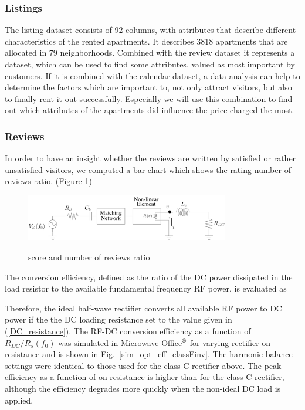 \subsubsection{Listings}
The listing dataset consists of 92 columns, with attributes that describe different characteristics of the rented apartments. It describes 3818 apartments that are allocated in 79 neighborhoods. Combined with the review dataset it represents a dataset, which can be used to find some attributes, valued as most important by customers. If it is combined with the calendar dataset, a data analysis can help to determine the factors which are important to, not only attract visitors, but also to finally rent it out successfully. Especially we will use this combination to find out which attributes of the apartments did influence the price charged the most.
\subsubsection{Reviews}
In order to have an insight whether the reviews are written by satisfied or rather unsatisfied visitors, we computed a bar chart which shows the rating-number of reviews ratio. (Figure \ref{score_reviews_ratio})
\begin{figure}
  \begin{center}
  \includegraphics[width=3.5in]{pdf/01.pdf}\\
  \caption{score and number of reviews ratio}\label{score_reviews_ratio}
  \end{center}
\end{figure}


The conversion efficiency, defined as the ratio of the DC power dissipated in the load resistor to the available fundamental frequency RF power, is evaluated as


Therefore, the ideal half-wave rectifier converts all available RF power to DC power if the the DC loading resistance set to the value given in (\ref{DC_resistance}). The RF-DC conversion efficiency as a function of $R_{DC} / R_s(f_0)$ was simulated in Microwave Office$\textsuperscript{\textregistered}$ for varying rectifier on-resistance and is shown in Fig.~\ref{sim_opt_eff_classFinv}. The harmonic balance settings were identical to those used for the class-C rectifier above. The peak efficiency as a function of on-resistance is higher than for the class-C rectifier, although the efficiency degrades more quickly when the non-ideal DC load is applied.

